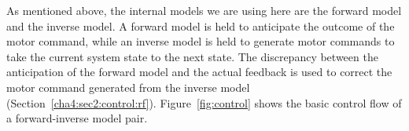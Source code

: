 As mentioned above, the internal models we are using here are the forward model and the inverse model.
A forward model is held to anticipate the outcome of the motor command, while an inverse model is held to generate motor commands to take the current system state to the next state. The discrepancy between the anticipation of the forward model and the actual feedback is used to correct the motor command generated from the inverse model (Section~\ref{cha4:sec2:control:rf}). Figure~\ref{fig:control} shows the basic control flow of a forward-inverse model pair.

